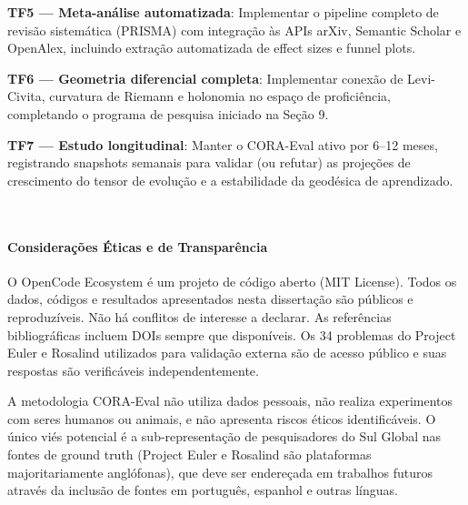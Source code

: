 \textbf{TF5 — Meta-análise automatizada}: Implementar o pipeline completo de
revisão sistemática (PRISMA) com integração às APIs arXiv, Semantic Scholar
e OpenAlex, incluindo extração automatizada de effect sizes e funnel plots.

\textbf{TF6 — Geometria diferencial completa}: Implementar conexão de
Levi-Civita, curvatura de Riemann e holonomia no espaço de proficiência,
completando o programa de pesquisa iniciado na Seção 9.

\textbf{TF7 — Estudo longitudinal}: Manter o CORA-Eval ativo por 6--12 meses,
registrando snapshots semanais para validar (ou refutar) as projeções de
crescimento do tensor de evolução e a estabilidade da geodésica de aprendizado.

\\\paragraph{Considerações Éticas e de Transparência}

O OpenCode Ecosystem é um projeto de código aberto (MIT License). Todos os
dados, códigos e resultados apresentados nesta dissertação são públicos e
reproduzíveis. Não há conflitos de interesse a declarar. As referências
bibliográficas incluem DOIs sempre que disponíveis. Os 34 problemas do
Project Euler e Rosalind utilizados para validação externa são de acesso
público e suas respostas são verificáveis independentemente.

A metodologia CORA-Eval não utiliza dados pessoais, não realiza experimentos
com seres humanos ou animais, e não apresenta riscos éticos identificáveis.
O único viés potencial é a sub-representação de pesquisadores do Sul Global
nas fontes de ground truth (Project Euler e Rosalind são plataformas
majoritariamente anglófonas), que deve ser endereçada em trabalhos futuros
através da inclusão de fontes em português, espanhol e outras línguas.
